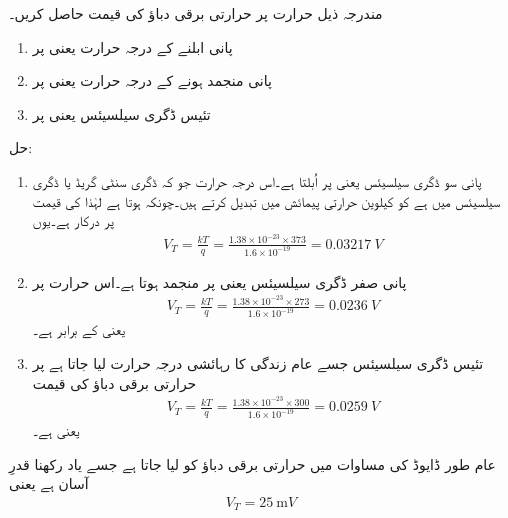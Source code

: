 مندرجہ ذیل حرارت پر حرارتی برقی دباؤ   کی قیمت حاصل کریں۔
\begin{enumerate}
\item
پانی ابلنے کے درجہ حرارت یعنی   پر

\item

پانی منجمد ہونے کے درجہ حرارت یعنی  پر
\item

تئیس ڈگری سیلسیئس یعنی   پر
\end{enumerate}




حل:
\begin{enumerate}
\item
پانی سو ڈگری سیلسیئس یعنی  پر اُبلتا ہے۔اس درجہ حرارت جو کہ ڈگری سنٹی گریڈ یا ڈگری سیلسیئس   میں ہے کو کیلوین  حرارتی پیمائش میں تبدیل کرتے ہیں۔چونکہ  ہوتا ہے لہٰذا  کی قیمت  پر درکار ہے۔یوں 
\begin{align*}
V_T =\frac{k T}{q} =\frac{1.38 \times 10^{-23} \times 373}{1.6 \times 10^{-19}}=\SI{0.03217}{V}
\end{align*}

\item
پانی صفر ڈگری سیلسیئس یعنی  پر منجمد ہوتا ہے۔اس حرارت پر
\begin{align*}
V_T=\frac{k T}{q}=\frac{1.38 \times 10^{-23} \times 273}{1.6 \times 10^{-19}}=\SI{0.0236}{V}
\end{align*}
یعنی  کے برابر ہے۔
\item
تئیس ڈگری سیلسیئس جسے عام زندگی کا رہائشی درجہ حرارت لیا جاتا ہے پر حرارتی برقی دباؤ کی قیمت 
\begin{align*}
V_T=\frac{k T}{q}=\frac{1.38 \times 10^{-23} \times 300}{1.6 \times 10^{-19}}=\SI{0.0259}{V}
\end{align*}
یعنی   ہے۔
\end{enumerate}
عام طور ڈایوڈ کی مساوات میں حرارتی برقی دباؤ کو  لیا جاتا ہے جسے یاد رکھنا قدرِ آسان ہے یعنی
\begin{align}
V_T=\SI{25}{\milli V}
\end{align}


